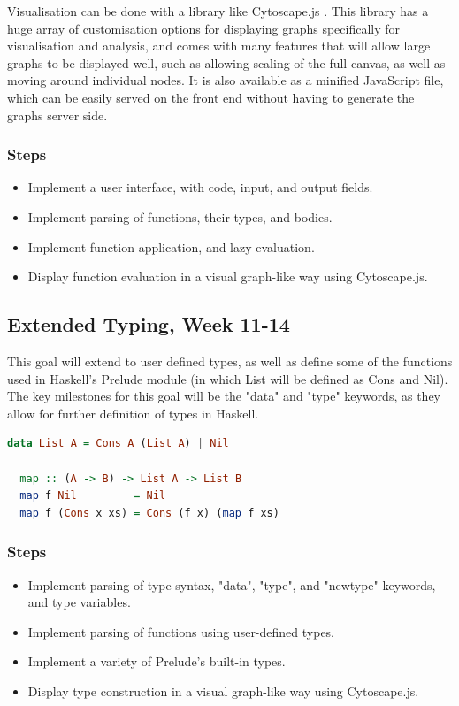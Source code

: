 \documentclass[a4paper]{article}
\begin{document}
Visualisation can be done with a library like Cytoscape.js \cite{cytoscape}. This library has a huge array of customisation options for displaying graphs specifically for visualisation and analysis, and comes with many features that will allow large graphs to be displayed well, such as allowing scaling of the full canvas, as well as moving around individual nodes. It is also available as a minified JavaScript file, which can be easily served on the front end without having to generate the graphs server side.
\subsubsection{Steps}
\begin{itemize}
    \item Implement a user interface, with code, input, and output fields.
    \item Implement parsing of functions, their types, and bodies.
    \item Implement function application, and lazy evaluation.
    \item Display function evaluation in a visual graph-like way using Cytoscape.js.
\end{itemize}
\subsection{Extended Typing, Week 11-14}
\label{extended-typing}
This goal will extend to user defined types, as well as define some of the functions used in Haskell's Prelude module (in which List will be defined as Cons and Nil). The key milestones for this goal will be the "data" and "type" keywords, as they allow for further definition of types in Haskell.
\begin{lstlisting}[language=haskell, caption=Example functions/types of stage 2.]
  data List A = Cons A (List A) | Nil

  map :: (A -> B) -> List A -> List B
  map f Nil         = Nil
  map f (Cons x xs) = Cons (f x) (map f xs)
\end{lstlisting}
\subsubsection{Steps}
\begin{itemize}
    \item Implement parsing of type syntax, "data", "type", and "newtype" keywords, and type variables.
    \item Implement parsing of functions using user-defined types.
    \item Implement a variety of Prelude's built-in types.
    \item Display type construction in a visual graph-like way using Cytoscape.js.
\end{itemize}
\end{document}
